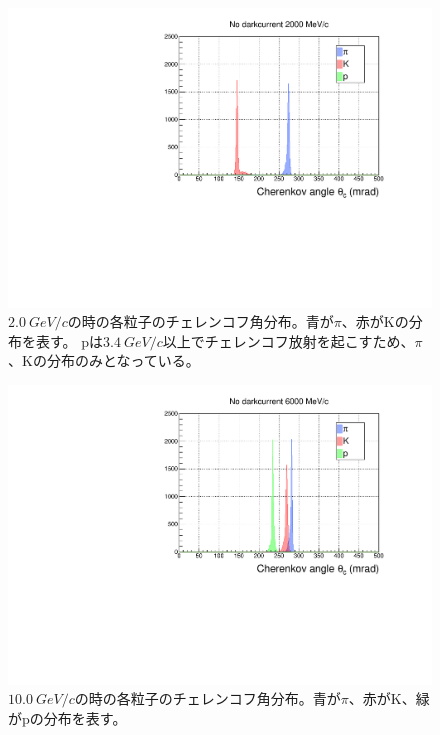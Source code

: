 \begin{figure}[htbp]
  \centering
  \includegraphics[width=15cm, page=1]{images/chapter4/2000MeV.pdf}
  \caption{
    $\SI{2.0}{GeV/c}$の時の各粒子のチェレンコフ角分布。青が$\pi$、赤がKの分布を表す。
    pは$\SI{3.4}{GeV/c}$以上でチェレンコフ放射を起こすため、$\pi$、Kの分布のみとなっている。
  }
  \label{fig:cherenkovAngleDistribution1}
\end{figure}
\begin{figure}[htbp]
  \centering
  \includegraphics[width=15cm, page=1]{images/chapter4/6000MeV.pdf}
  \caption{
    $\SI{10.0}{GeV/c}$の時の各粒子のチェレンコフ角分布。青が$\pi$、赤がK、緑がpの分布を表す。
  }
  \label{fig:cherenkovAngleDistribution2}
\end{figure}

